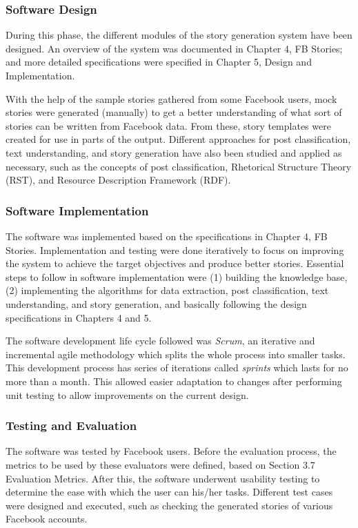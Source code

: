 \subsubsection{Software Design}
During this phase, the different modules of the story generation system have been designed. An overview of the system was documented in Chapter 4, FB Stories; and more detailed specifications were specified in Chapter 5, Design and Implementation.

With the help of the sample stories gathered from some Facebook users, mock stories were generated (manually) to get a better understanding of what sort of stories can be written from Facebook data. From these, story templates were created for use in parts of the output. Different approaches for post classification, text understanding, and story generation have also been studied and applied as necessary, such as the concepts of post classification, Rhetorical Structure Theory (RST), and Resource Description Framework (RDF).

\subsubsection{Software Implementation}
The software was implemented based on the specifications in Chapter 4, FB Stories. Implementation and testing were done iteratively to focus on improving the system to achieve the target objectives and produce better stories. Essential steps to follow in software implementation were (1) building the knowledge base, (2) implementing the algorithms for data extraction, post classification, text understanding, and story generation, and basically following the design specifications in Chapters 4 and 5.

The software development life cycle followed was \textit{Scrum}, an iterative and incremental agile methodology which splits the whole process into smaller tasks. This development process has series of iterations called \textit{sprints} which lasts for no more than a month. This allowed easier adaptation to changes after performing unit testing to allow improvements on the current design.

\subsubsection{Testing and Evaluation}
The software was tested by Facebook users. Before the evaluation process, the metrics to be used by these evaluators were defined, based on Section 3.7 Evaluation Metrics. After this, the software underwent usability testing to determine the ease with which the user can his/her tasks. Different test cases were designed and executed, such as checking the generated stories of various Facebook accounts.

